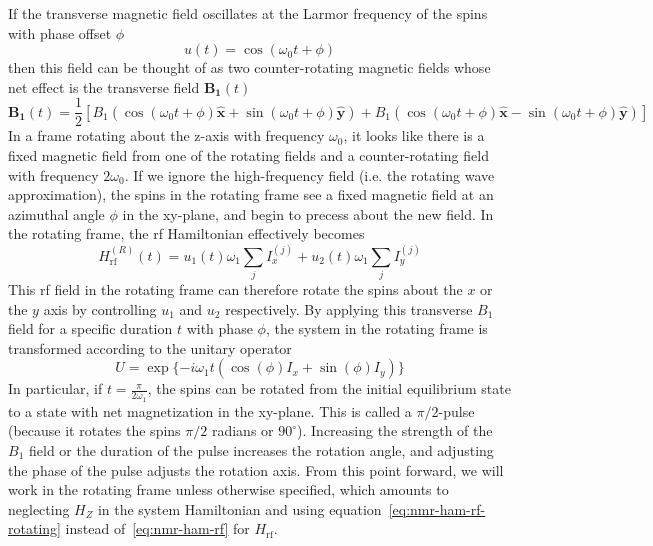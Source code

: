 If the transverse magnetic field oscillates at the Larmor frequency of the spins with phase offset $\phi$
\begin{equation}
    u(t) = \cos(\omega_0 t + \phi)
\end{equation}
then this field can be thought of as two counter-rotating magnetic fields whose net effect is the transverse field $\mathbf{B_1}(t)$
\begin{equation}
    \mathbf{B_1}(t) = \frac{1}{2} \left[
        B_1 (\cos(\omega_0 t + \phi) \mathbf{\hat{x}} + \sin(\omega_0 t + \phi) \mathbf{\hat{y}}) +
        B_1 (\cos(\omega_0 t + \phi) \mathbf{\hat{x}} - \sin(\omega_0 t + \phi) \mathbf{\hat{y}})
    \right]
\end{equation}
%
%
In a frame rotating about the z-axis with frequency $\omega_0$, it looks like there is a fixed magnetic field from one of the rotating fields and a counter-rotating field with frequency $2\omega_0$. If we ignore the high-frequency field (i.e. the rotating wave approximation), the spins in the rotating frame see a fixed magnetic field at an azimuthal angle $\phi$ in the xy-plane, and begin to precess about the new field.
In the rotating frame, the rf Hamiltonian effectively becomes
\begin{equation}\label{eq:nmr-ham-rf-rotating}
    H^{(R)}_\text{rf}(t) = u_1(t) \omega_1 \sum_j I_x^{(j)} + u_2(t) \omega_1 \sum_j I_y^{(j)}
\end{equation}
This rf field in the rotating frame can therefore rotate the spins about the $x$ or the $y$ axis by controlling $u_1$ and $u_2$ respectively.
By applying this transverse $B_1$ field for a specific duration $t$ with phase $\phi$, the system in the rotating frame is transformed according to the unitary operator
\begin{equation}
    U = \exp\{-i \omega_1 t (\cos(\phi) I_x + \sin(\phi) I_y)\}
\end{equation}
In particular, if $t = \frac{\pi}{2 \omega_1}$, the spins can be rotated from the initial equilibrium state to a state with net magnetization in the xy-plane. This is called a $\pi/2$-pulse (because it rotates the spins $\pi/2$ radians or $90^\circ$). Increasing the strength of the $B_1$ field or the duration of the pulse increases the rotation angle, and adjusting the phase of the pulse adjusts the rotation axis.
From this point forward, we will work in the rotating frame unless otherwise specified, which amounts to neglecting $H_Z$ in the system Hamiltonian and using equation~\ref{eq:nmr-ham-rf-rotating} instead of~\ref{eq:nmr-ham-rf} for $H_{\text{rf}}$.

